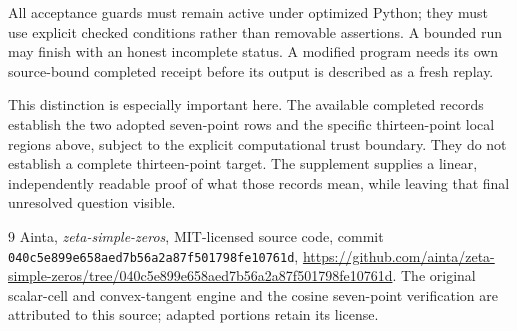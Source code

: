 \documentclass[11pt]{amsart}
\numberwithin{equation}{section}
\begin{document}
All acceptance guards must remain active under optimized Python;
they must use explicit checked conditions rather than removable
assertions. A bounded run may finish with an honest incomplete
status. A modified program needs its own source-bound
completed receipt before its output is described as a fresh replay.

This distinction is especially important here. The available
completed records establish the two adopted seven-point rows and
the specific thirteen-point local regions above, subject to the
explicit computational trust boundary. They do not establish a
complete thirteen-point target. The supplement supplies a linear,
independently readable proof of what those records mean, while
leaving that final unresolved question visible.

\begin{thebibliography}{9}
Ainta, \emph{zeta-simple-zeros}, MIT-licensed source code,
commit \texttt{040c5e899e658aed7b56a2a87f501798fe10761d},
\url{https://github.com/ainta/zeta-simple-zeros/tree/040c5e899e658aed7b56a2a87f501798fe10761d}.
The original scalar-cell and convex-tangent engine and the cosine
seven-point verification are attributed to this source; adapted
portions retain its license.
\end{thebibliography}
\end{document}
